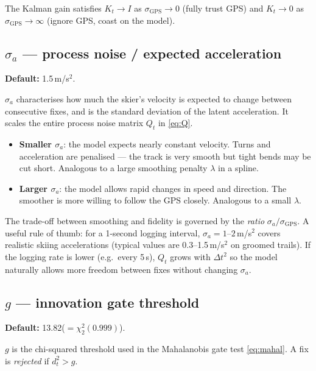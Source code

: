 \documentclass[11pt, a4paper]{article}
\theoremstyle{remark}
\begin{document}
The Kalman gain satisfies $K_t \to I$ as $\sigma_{\mathrm{GPS}} \to 0$
(fully trust GPS) and $K_t \to 0$ as $\sigma_{\mathrm{GPS}} \to \infty$
(ignore GPS, coast on the model).

\subsection{\texorpdfstring{$\sigma_a$}{sigma\_a} — process noise / expected acceleration}

\textbf{Default:} 1.5\,m/s$^2$.

$\sigma_a$ characterises how much the skier's velocity is expected to
change between consecutive fixes, and is the standard deviation of the
latent acceleration.  It scales the entire process noise matrix $Q_t$
in \eqref{eq:Q}.

\begin{itemize}
  \item \textbf{Smaller $\sigma_a$}: the model expects nearly constant velocity.
        Turns and acceleration are penalised — the track is very smooth
        but tight bends may be cut short.
        Analogous to a large smoothing penalty $\lambda$ in a spline.

  \item \textbf{Larger $\sigma_a$}: the model allows rapid changes in speed and
        direction.  The smoother is more willing to follow the GPS closely.
        Analogous to a small $\lambda$.
\end{itemize}

The trade-off between smoothing and fidelity is governed by the
\emph{ratio} $\sigma_a / \sigma_{\mathrm{GPS}}$.  A useful rule of thumb:
for a 1-second logging interval, $\sigma_a = 1$--$2$\,m/s$^2$ covers
realistic skiing accelerations (typical values are 0.3--1.5\,m/s$^2$
on groomed trails).  If the logging rate is lower (e.g.\ every 5\,s),
$Q_t$ grows with $\Delta t^2$ so the model naturally allows more freedom
between fixes without changing $\sigma_a$.

\subsection{\texorpdfstring{$g$}{g} — innovation gate threshold}

\textbf{Default:} 13.82\;($= \chi^2_2(0.999)$).

$g$ is the chi-squared threshold used in the Mahalanobis gate test
\eqref{eq:mahal}.  A fix is \emph{rejected} if $d_t^2 > g$.
\end{document}
